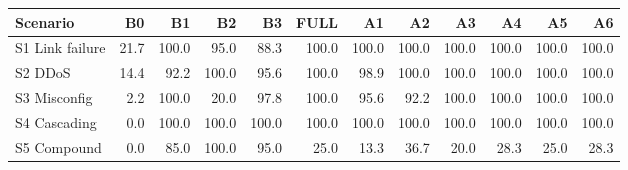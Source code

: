 \begin{tabular}{lrrrrrrrrrrr}
\toprule
Scenario & B0 & B1 & B2 & B3 & FULL & A1 & A2 & A3 & A4 & A5 & A6 \\
\midrule
S1 Link failure & 21.7 & 100.0 & 95.0 & 88.3 & 100.0 & 100.0 & 100.0 & 100.0 & 100.0 & 100.0 & 100.0 \\
S2 DDoS & 14.4 & 92.2 & 100.0 & 95.6 & 100.0 & 98.9 & 100.0 & 100.0 & 100.0 & 100.0 & 100.0 \\
S3 Misconfig & 2.2 & 100.0 & 20.0 & 97.8 & 100.0 & 95.6 & 92.2 & 100.0 & 100.0 & 100.0 & 100.0 \\
S4 Cascading & 0.0 & 100.0 & 100.0 & 100.0 & 100.0 & 100.0 & 100.0 & 100.0 & 100.0 & 100.0 & 100.0 \\
S5 Compound & 0.0 & 85.0 & 100.0 & 95.0 & 25.0 & 13.3 & 36.7 & 20.0 & 28.3 & 25.0 & 28.3 \\
\bottomrule
\end{tabular}

